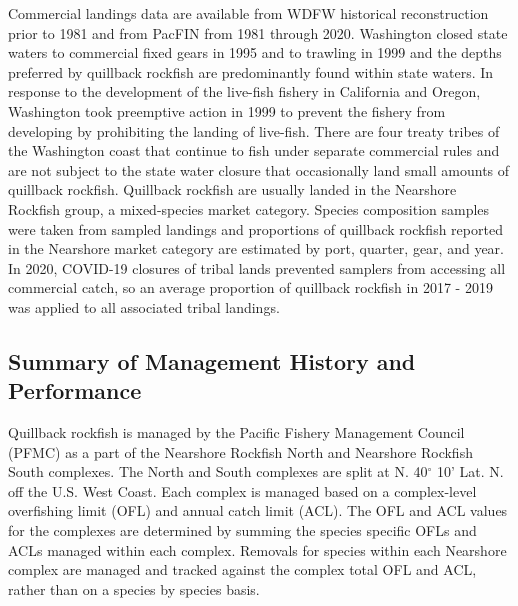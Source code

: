 \documentclass[11pt,
  english,
  a4paper,
]{article}
\begin{document}
\leavevmode\tagmcend\tagstructend\par


Commercial landings data are available from WDFW historical reconstruction prior to 1981 and from PacFIN from 1981 through 2020. Washington closed state waters to commercial fixed gears in 1995 and to trawling in 1999 and the depths preferred by quillback rockfish are predominantly found within state waters. In response to the development of the live-fish fishery in California and Oregon, Washington took preemptive action in 1999 to prevent the fishery from developing by prohibiting the landing of live-fish. There are four treaty tribes of the Washington coast that continue to fish under separate commercial rules and are not subject to the state water closure that occasionally land small amounts of quillback rockfish. Quillback rockfish are usually landed in the Nearshore Rockfish group, a mixed-species market category. Species composition samples were taken from sampled landings and proportions of quillback rockfish reported in the Nearshore market category are estimated by port, quarter, gear, and year. In 2020, COVID-19 closures of tribal lands prevented samplers from accessing all commercial catch, so an average proportion of quillback rockfish in 2017 - 2019 was applied to all associated tribal landings.

\leavevmode\tagmcend\tagstructend\par


\hypertarget{summary-of-management-history-and-performance}{%
\subsection{Summary of Management History and Performance}\label{summary-of-management-history-and-performance}}

\leavevmode\tagmcend\tagstructend


Quillback rockfish is managed by the Pacific Fishery Management Council (PFMC) as a part of the Nearshore Rockfish North and Nearshore Rockfish South complexes. The North and South complexes are split at N. 40{\(^\circ\)\leavevmode\tagmcend\tagstructend} 10' Lat. N. off the U.S. West Coast. Each complex is managed based on a complex-level overfishing limit (OFL) and annual catch limit (ACL). The OFL and ACL values for the complexes are determined by summing the species specific OFLs and ACLs managed within each complex. Removals for species within each Nearshore complex are managed and tracked against the complex total OFL and ACL, rather than on a species by species basis.
\end{document}

